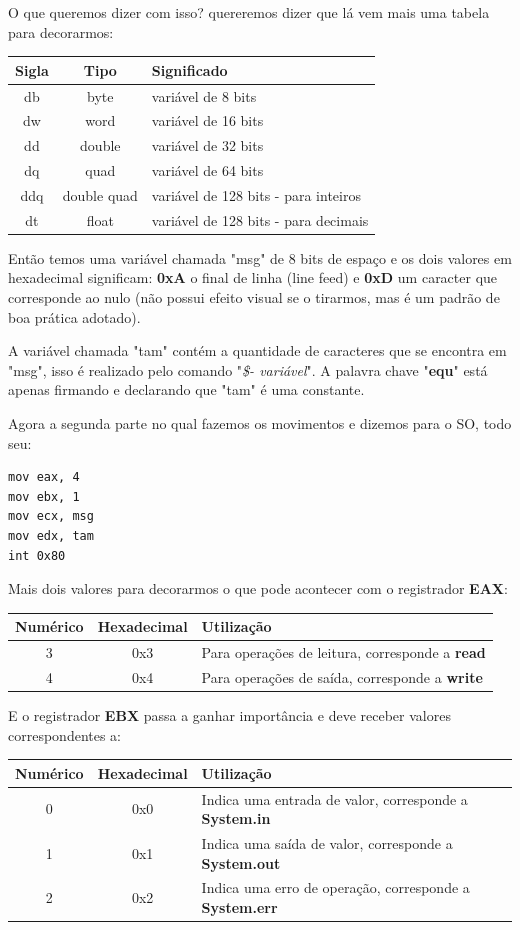 O que queremos dizer com isso? quereremos dizer que lá vem mais uma tabela para decorarmos:
\begin{table}[H]
	\centering 
	\begin{tabular}{c | c | l }
		\textbf{Sigla} & \textbf{Tipo} & \textbf{Significado} \\ \hline
		db & byte & variável de 8 bits \\
		dw & word & variável de 16 bits \\
		dd & double & variável de 32 bits \\
		dq & quad & variável de 64 bits \\
		ddq & double quad & variável de 128 bits - para inteiros \\
		dt & float & variável de 128 bits - para decimais
	\end{tabular}
\end{table}

Então temos uma variável chamada "msg" de 8 bits de espaço e os dois valores em hexadecimal significam: \textbf{0xA} o final de linha (line feed) e \textbf{0xD} um caracter que corresponde ao nulo (não possui efeito visual se o tirarmos, mas é um padrão de boa prática adotado).

A variável chamada "tam" contém a quantidade de caracteres que se encontra em "msg", isso é realizado pelo comando "\textit{\$- variável}". A palavra chave "\textbf{equ}" está apenas firmando e declarando que "tam" é uma constante.

Agora a segunda parte no qual fazemos os movimentos e dizemos para o SO, todo seu:
\begin{lstlisting}[]
mov eax, 4
mov ebx, 1
mov ecx, msg
mov edx, tam
int 0x80
\end{lstlisting}

Mais dois valores para decorarmos o que pode acontecer com o registrador \textbf{EAX}:
\begin{table}[H]
	\centering 
	\begin{tabular}{c | c | l }
		\textbf{Numérico} & \textbf{Hexadecimal} & \textbf{Utilização} \\ \hline
		3 & 0x3 & Para operações de leitura, corresponde a \textbf{read} \\
		4 & 0x4 & Para operações de saída, corresponde a \textbf{write}
	\end{tabular}
\end{table}

E o registrador \textbf{EBX} passa a ganhar importância e deve receber valores correspondentes a:
\begin{table}[H]
	\centering 
	\begin{tabular}{c | c | l }
		\textbf{Numérico} & \textbf{Hexadecimal} & \textbf{Utilização} \\ \hline
		0 & 0x0 & Indica uma entrada de valor, corresponde a \textbf{System.in} \\
		1 & 0x1 & Indica uma saída de valor, corresponde a \textbf{System.out} \\
		2 & 0x2 & Indica uma erro de operação, corresponde a \textbf{System.err}
	\end{tabular}
\end{table}

